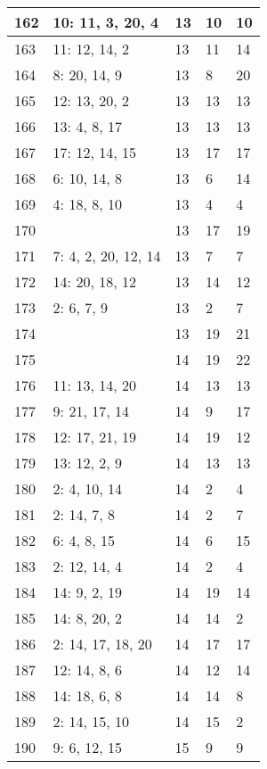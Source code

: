 \documentclass{article} %
\begin{document}
\begin{longtable}{| l | l | l | l | l |}
        162 & 10: 11, 3, 20, 4 & 13 & 10 & 10 \\ \hline
        163 & 11: 12, 14, 2 & 13 & 11 & 14 \\ \hline
        164 & 8: 20, 14, 9 & 13 & 8 & 20 \\ \hline
        165 & 12: 13, 20, 2 & 13 & 13 & 13 \\ \hline
        166 & 13: 4, 8, 17 & 13 & 13 & 13 \\ \hline
        167 & 17: 12, 14, 15 & 13 & 17 & 17 \\ \hline
        168 & 6: 10, 14, 8 & 13 & 6 & 14 \\ \hline
        169 & 4: 18, 8, 10 & 13 & 4 & 4 \\ \hline
        170 &  & 13 & 17 & 19 \\ \hline
        171 & 7: 4, 2, 20, 12, 14 & 13 & 7 & 7 \\ \hline
        172 & 14: 20, 18, 12 & 13 & 14 & 12 \\ \hline
        173 & 2: 6, 7, 9 & 13 & 2 & 7 \\ \hline
        174 &  & 13 & 19 & 21 \\ \hline
        175 &  & 14 & 19 & 22 \\ \hline
        176 & 11: 13, 14, 20 & 14 & 13 & 13 \\ \hline
        177 & 9: 21, 17, 14 & 14 & 9 & 17 \\ \hline
        178 & 12: 17, 21, 19 & 14 & 19 & 12 \\ \hline
        179 & 13: 12, 2, 9 & 14 & 13 & 13 \\ \hline
        180 & 2: 4, 10, 14 & 14 & 2 & 4 \\ \hline
        181 & 2: 14, 7, 8 & 14 & 2 & 7 \\ \hline
        182 & 6: 4, 8, 15 & 14 & 6 & 15 \\ \hline
        183 & 2: 12, 14, 4 & 14 & 2 & 4 \\ \hline
        184 & 14: 9, 2, 19 & 14 & 19 & 14 \\ \hline
        185 & 14: 8, 20, 2 & 14 & 14 & 2 \\ \hline
        186 & 2: 14, 17, 18, 20 & 14 & 17 & 17 \\ \hline
        187 & 12: 14, 8, 6 & 14 & 12 & 14 \\ \hline
        188 & 14: 18, 6, 8 & 14 & 14 & 8 \\ \hline
        189 & 2: 14, 15, 10 & 14 & 15 & 2 \\ \hline
        190 & 9: 6, 12, 15 & 15 & 9 & 9 \\ \hline

\end{longtable}
\end{document}
